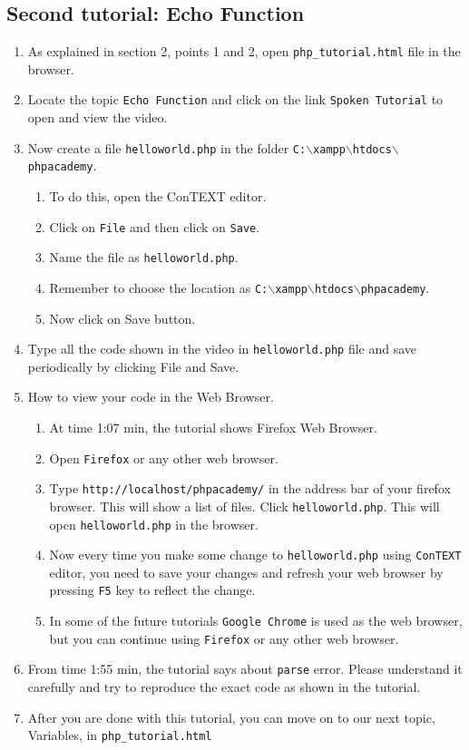 \documentclass[11pt]{article}
\newenvironment{enumcpt}{\begin{enumerate} \topsep 0pt \partopsep 0pt 
                        \parsep 0pt
                        \itemsep 0pt \leftmargin -1in \rightmargin 0pt
                        }{\end{enumerate}}
\begin{document}
\begin{multicols}{2}
\section{Second tutorial: Echo Function}
\begin{enumcpt}
\item As explained in section 2, points 1 and 2, open {\tt php\_tutorial.html} file in the browser.
\item Locate the topic {\tt Echo Function} and click on the link {\tt Spoken Tutorial} to open and view the video.
\item Now create a file {\tt helloworld.php} in the folder
{\tt C:$\backslash$xampp$\backslash$htdocs$\backslash$phpacademy}.
\begin{enumcpt}
\item To do this, open the ConTEXT editor.
\item Click on {\tt File} and then click on {\tt Save}. 
\item Name the file as {\tt helloworld.php}.
\item Remember to choose the location as {\tt C:$\backslash$xampp$\backslash$htdocs$\backslash$phpacademy}.
\item Now click on Save button.
\end{enumcpt}
\item Type all the code shown in the video in {\tt helloworld.php} file and save periodically by clicking File and Save.
\item How to view your code in the Web Browser. 
\begin{enumcpt}
\item At time 1:07 min, the tutorial shows Firefox Web Browser.
\item Open {\tt Firefox} or any other web browser.
\item Type {\tt http://localhost/phpacademy/} in the address bar of your firefox browser. This will show a list of files. Click {\tt helloworld.php}. This will open {\tt helloworld.php} in the browser.
\item Now every time you make some change to {\tt helloworld.php} using {\tt ConTEXT} editor, you need to save your changes and refresh your web browser by pressing {\tt F5} key to reflect the change.
\item In some of the future tutorials {\tt Google Chrome} is used as the web browser, but you can continue using {\tt Firefox} or any other web browser.
\end{enumcpt}
\item From time 1:55 min, the tutorial says about {\tt parse} error.  Please understand it carefully and try to reproduce the exact code as shown in the tutorial. 
\item After you are done with this tutorial, you can move on to our next topic, Variables, in {\tt php\_tutorial.html}
\end{enumcpt}


\end{multicols}
\end{document}
